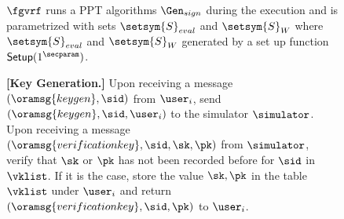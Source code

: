 
\begin{figure}
	\begin{tcolorbox}[left=2pt,right=2pt]
	\small
		{  $ \fgvrf $ runs a PPT algorithms  $\Gen_{sign} $ during the execution and is parametrized with  sets $ \setsym{S}_{eval} $ and $ \setsym{S}_W $ where $ \setsym{S}_{eval} $ and $ \setsym{S}_W $ generated by a set up function $ \mathsf{Setup}(1^\secparam) $.
	
		\textbf{[Key Generation.]} Upon receiving a message $(\oramsg{keygen}, \sid)$ from  $\user_i$, send $(\oramsg{keygen}, \sid, \user_i)$ to the simulator $\simulator$.
		Upon receiving a message $(\oramsg{verificationkey}, \allowbreak \sid, \sk,\pk)$ from $\simulator$, verify that $\sk $ or $\pk$ has not been recorded before for $ \sid $ in $ \vklist $. If it is the case, store  the value $\sk,\pk$ in the table $\vklist$ under $\user_i$ and return $(\oramsg{verificationkey}, \sid, \pk)$ to $ \user_i$.
			
			
}
\end{tcolorbox}
\end{figure}
